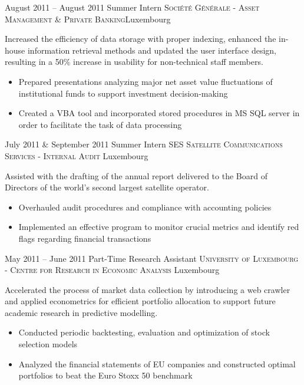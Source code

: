 \documentclass[11pt,a4paper,sans]{moderncv}
\begin{document}
\cventry
	{August 2011 -- August 2011}
	{Summer Intern}
	{\textsc{Société Générale - Asset Management \& Private Banking}}{Luxembourg}{}
	{
	Increased the efficiency of data storage with proper indexing, enhanced the in-house information retrieval methods and updated the user interface design, resulting in a 50\% increase in usability for non-technical staff members. 
	\vspace{1mm}
	\begin{itemize}
		\item Prepared presentations analyzing major net asset value fluctuations of institutional funds to support investment decision-making
		\item Created a VBA tool and incorporated stored procedures in MS SQL server in order to facilitate the task of data processing
		\vspace{2mm}
	\end{itemize}
	}
\cventry
	{July 2011 \& September 2011 }
	{Summer Intern}
	{\textsc{SES Satellite Communications Services - Internal Audit}}
	{Luxembourg}{}
	{
	Assisted with the drafting of the annual report delivered to the Board of Directors of the world's second largest satellite operator.\vspace{1mm}
	\begin{itemize}
		\item Overhauled audit procedures and compliance with accounting policies
		\item Implemented an effective program to monitor crucial metrics and identify red flags regarding financial transactions
		\vspace{2mm}
	\end{itemize}
	}
\cventry
	{May 2011 -- June 2011}
	{Part-Time Research Assistant}
	{\textsc{University of Luxembourg - Centre for Research in Economic Analysis}}
	{Luxembourg}{}
	{
	Accelerated the process of market data collection by introducing a web crawler and applied econometrics for efficient portfolio allocation to support future academic research in predictive modelling. 
	\vspace{1mm}
	\begin{itemize}
		\item Conducted periodic backtesting, evaluation and optimization of stock selection models
		\item Analyzed the financial statements of EU companies and constructed optimal portfolios to beat the Euro Stoxx 50 benchmark
	\end{itemize}
	}
\end{document}
